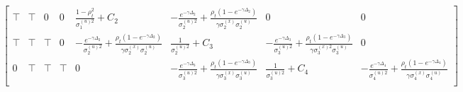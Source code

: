 \begin{landscape}
\begin{align*}
\begin{bmatrix}
\top &  \top & 0 & 0 & \frac{1-\rho_{t}^2}{\sigma_1^{\left(u\right)2}}+C_2 & -\frac{e^{-\gamma\Delta_2}}{\sigma_2^{\left(u\right)2}}+\frac{\rho_{t}\left(1-e^{-\gamma\Delta_2}\right)}{\gamma\sigma_2^{\left(x\right)}\sigma_2^{\left(u\right)}} & 0 & 0 \\
  \top &  \top & \top& 0 & -\frac{e^{-\gamma\Delta_2}}{\sigma_2^{\left(u\right)2}}+\frac{\rho_{t}\left(1-e^{-\gamma\Delta_2}\right)}{\gamma\sigma_2^{\left(x\right)}\sigma_2^{\left(u\right)}}   & \frac{1}{\sigma_2^{\left(u\right)2}}+C_3 & -\frac{e^{-\gamma\Delta_3}}{\sigma_3^{\left(u\right)2}}+\frac{\rho_{t}\left(1-e^{-\gamma\Delta_3}\right)}{\gamma\sigma_3^{\left(x\right)2}\sigma_3^{\left(u\right)}} & 0 \\
  0 &\top&\top & \top& 0 & -\frac{e^{-\gamma\Delta_3}}{\sigma_3^{\left(u\right)2}}+\frac{\rho_{t}\left(1-e^{-\gamma\Delta_3}\right)}{\gamma\sigma_3^{\left(x\right)}\sigma_3^{\left(u\right)}}  & \frac{1}{\sigma_3^{\left(u\right)2}}+C_4 & -\frac{e^{-\gamma\Delta_4}}{\sigma_4^{\left(u\right)2}}+\frac{\rho_{t}\left(1-e^{-\gamma\Delta_4}\right)}{\gamma\sigma_4^{\left(x\right)}\sigma_4^{\left(u\right)}}  \\

\end{bmatrix}
\end{align*}
\end{landscape}
